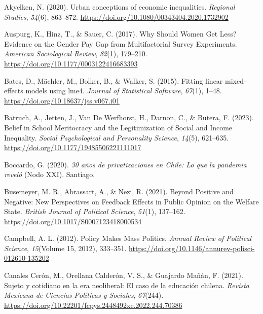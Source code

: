 \documentclass[
  12pt,
]{article}
\newlength{\cslhangindent}
\newenvironment{CSLReferences}[2] %
 {\begin{list}{}{%
  \setlength{\itemindent}{0pt}
  \setlength{\leftmargin}{0pt}
  \setlength{\parsep}{0pt}
  \ifodd #1
   \setlength{\leftmargin}{\cslhangindent}
   \setlength{\itemindent}{-1\cslhangindent}
  \fi
  \setlength{\itemsep}{#2\baselineskip}}}
 {\end{list}}
\begin{document}
\label{refs}
\begin{CSLReferences}{1}{0}
Akyelken, N. (2020). Urban conceptions of economic inequalities.
\emph{Regional Studies}, \emph{54}(6), 863--872.
\url{https://doi.org/10.1080/00343404.2020.1732902}

Auspurg, K., Hinz, T., \& Sauer, C. (2017). Why {Should Women Get Less}?
{Evidence} on the {Gender Pay Gap} from {Multifactorial Survey
Experiments}. \emph{American Sociological Review}, \emph{82}(1),
179--210. \url{https://doi.org/10.1177/0003122416683393}

Bates, D., Mächler, M., Bolker, B., \& Walker, S. (2015). Fitting linear
mixed-effects models using {lme4}. \emph{Journal of Statistical
Software}, \emph{67}(1), 1--48.
\url{https://doi.org/10.18637/jss.v067.i01}

Batruch, A., Jetten, J., Van De Werfhorst, H., Darnon, C., \& Butera, F.
(2023). Belief in {School Meritocracy} and the {Legitimization} of
{Social} and {Income Inequality}. \emph{Social Psychological and
Personality Science}, \emph{14}(5), 621--635.
\url{https://doi.org/10.1177/19485506221111017}

Boccardo, G. (2020). \emph{30 a{ñ}os de privatizaciones en {Chile}: Lo
que la pandemia revel{ó}} (Nodo XXI). Santiago.

Busemeyer, M. R., Abrassart, A., \& Nezi, R. (2021). Beyond {Positive}
and {Negative}: {New Perspectives} on {Feedback Effects} in {Public
Opinion} on the {Welfare State}. \emph{British Journal of Political
Science}, \emph{51}(1), 137--162.
\url{https://doi.org/10.1017/S0007123418000534}

Campbell, A. L. (2012). Policy {Makes Mass Politics}. \emph{Annual
Review of Political Science}, \emph{15}(Volume 15, 2012), 333--351.
\url{https://doi.org/10.1146/annurev-polisci-012610-135202}

Canales Cerón, M., Orellana Calderón, V. S., \& Guajardo Mañán, F.
(2021). Sujeto y cotidiano en la era neoliberal: El caso de la
educaci{ó}n chilena. \emph{Revista Mexicana de Ciencias Pol{í}ticas y
Sociales}, \emph{67}(244).
\url{https://doi.org/10.22201/fcpys.2448492xe.2022.244.70386}


\end{CSLReferences}
\end{document}
